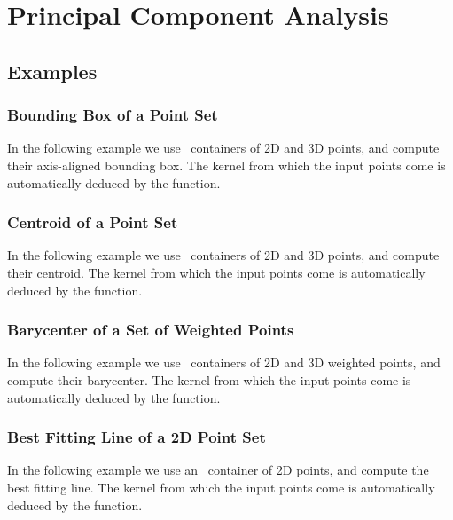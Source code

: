 \chapter{Principal Component Analysis}
\label{chap:pca}


\minitoc




\section{Examples}
\label{subsec:pca_examples}

\subsection{Bounding Box of a Point Set}

In the following example we use \stl\ containers of 2D and 3D points, and
compute their axis-aligned bounding box. The kernel from which the input points
come is automatically deduced by the function.


\subsection{Centroid of a Point Set}

In the following example we use \stl\ containers of 2D and 3D points, and
compute their centroid. The kernel from which the input points
come is automatically deduced by the function.


\subsection{Barycenter of a Set of Weighted Points}

In the following example we use \stl\ containers of 2D and 3D weighted points,
and compute their barycenter. The kernel from which the input points come is
automatically deduced by the function.


\subsection{Best Fitting Line of a 2D Point Set}

In the following example we use an \stl\ container of 2D points, and
compute the best fitting line. The kernel from which the input points
come is automatically deduced by the function.



